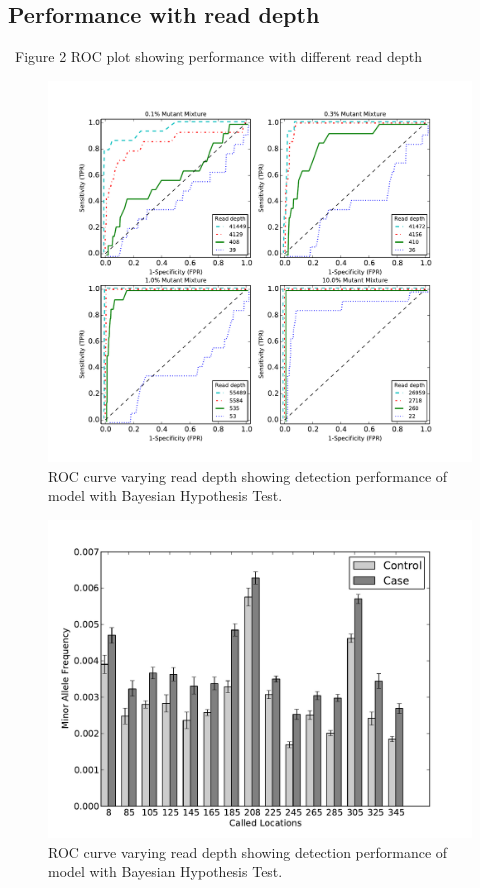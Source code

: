 \documentclass[11pt,reqno]{amsart}
\begin{document}
\subsection{Performance with read depth}\
Figure 2 ROC plot showing performance with different read depth

\begin{figure}[h]
\begin{center}
\includegraphics[width=160mm]{pdf_figs/ROC_without_chi2.pdf}
\caption{ROC curve varying read depth showing detection performance of model with Bayesian Hypothesis Test.}
\label{fig:ROC_without_chi2}
\end{center}
\end{figure}

\begin{figure}[h]
\begin{center}
\includegraphics[width=160mm]{pdf_figs/MuBarPlot.pdf}
\caption{ROC curve varying read depth showing detection performance of model with Bayesian Hypothesis Test.}
\label{fig:ROC_without_chi2}
\end{center}
\end{figure}
\end{document}
